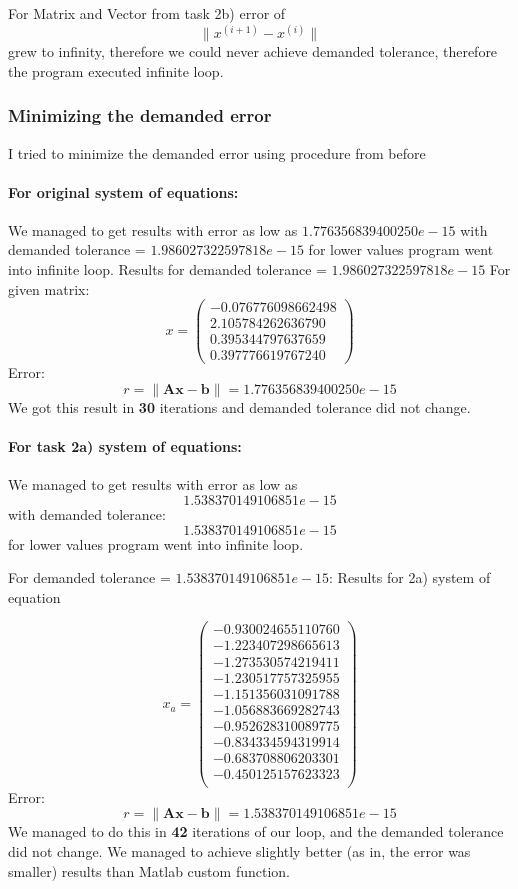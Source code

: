 For Matrix and Vector from task 2b) error of
\[ \| x^{(i+1)} - x^{(i)} \| \]
grew to infinity, therefore we could never achieve demanded tolerance, therefore the program executed infinite loop.

\subsubsection{Minimizing the demanded error}
I tried to minimize the demanded error using procedure from before
\paragraph{For original system of equations:}
We managed to get results with error as low as $1.776356839400250e-15$ with demanded tolerance = $ 1.986027322597818e-15 $ for lower values program went into infinite loop.
Results for demanded tolerance = $1.986027322597818e-15$
For given matrix:
\[ x = \left( \begin{array}{cc}
  -0.076776098662498 \\
   2.105784262636790 \\
   0.395344797637659 \\
   0.397776619767240
\end{array} \right)
\]
Error:
\[ r = \| \mathbf{A}\mathbf{x} - \mathbf{b}\| = 1.776356839400250e-15 \]
We got this result in \textbf{30} iterations and demanded tolerance did not change.

\newpage
\paragraph{For task 2a) system of equations:}
We managed to get results with error as low as
\[ 1.538370149106851e-15 \] with demanded tolerance:
\[ 1.538370149106851e-15 \]
for lower values program went into infinite loop.

For demanded tolerance = $1.538370149106851e-15$:
Results for 2a) system of equation

\[ x_a = \left( \begin{array}{cc}
-0.930024655110760 \\
-1.223407298665613 \\
-1.273530574219411 \\
-1.230517757325955 \\
-1.151356031091788 \\
-1.056883669282743 \\
-0.952628310089775 \\
-0.834334594319914 \\
-0.683708806203301 \\
-0.450125157623323 \\
\end{array} \right)
\]
Error:
\[ r = \| \mathbf{A}\mathbf{x} - \mathbf{b}\| = 1.538370149106851e-15 \]
We managed to do this in \textbf{42} iterations of our loop, and the demanded tolerance did not change.
We managed to achieve slightly better (as in, the error was smaller) results than Matlab custom function.


\newpage
